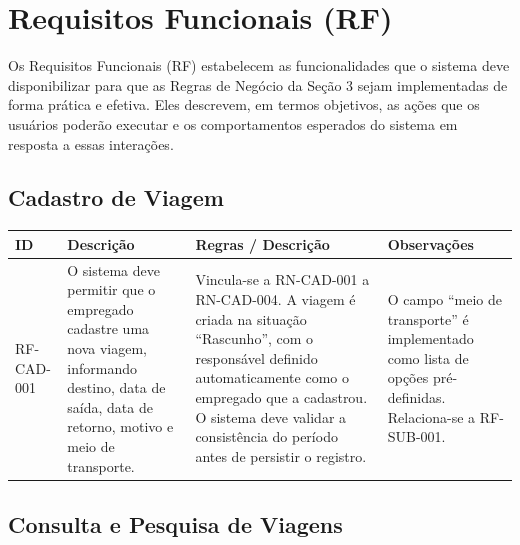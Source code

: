 \documentclass[12pt,article,oneside,a4paper]{abntex2}
\begin{document}
\bigskip

\section{Requisitos Funcionais (RF)}

Os Requisitos Funcionais (RF) estabelecem as funcionalidades que o sistema
deve disponibilizar para que as Regras de Negócio da Seção 3 sejam
implementadas de forma prática e efetiva. Eles descrevem, em termos
objetivos, as ações que os usuários poderão executar e os comportamentos
esperados do sistema em resposta a essas interações.

\subsection{Cadastro de Viagem}

\begin{xltabular}{\textwidth}{|l|Y|Y|Y|}
\hline
{}
\textbf{ID} & \textbf{Descrição} & \textbf{Regras / Descrição} & \textbf{Observações} \\
\hline
\endhead
RF-CAD-001 & O sistema deve permitir que o empregado cadastre uma nova viagem, informando destino, data de saída, data de retorno, motivo e meio de transporte. & Vincula-se a RN-CAD-001 a RN-CAD-004. A viagem é criada na situação ``Rascunho'', com o responsável definido automaticamente como o empregado que a cadastrou. O sistema deve validar a consistência do período antes de persistir o registro. & O campo ``meio de transporte'' é implementado como lista de opções pré-definidas. Relaciona-se a RF-SUB-001. \\
\hline
\end{xltabular}

\bigskip

\subsection{Consulta e Pesquisa de Viagens}
\end{document}
